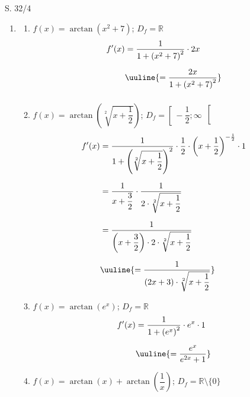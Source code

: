 \begin{Exercise}{S. 32/4}{}
    \begin{enumerate}
        \item [4.]\begin{enumerate}[label=\alph*)]
            \item[a)] {
                $f(x) = \arctan\left(x^{2} + 7\right)$; \qquad $D_{f} = \mathbb{R}$ \\[-2.0ex]
                \begin{align*}
                    f'(x) &= \dfrac{1}{1 + \left(x^{2} + 7\right)^{2}} \cdot 2x &&\\[1.5ex]
                    &\uuline{= \dfrac{2x}{1 + \left(x^{2} + 7\right)^{2}}} && \\[1.5ex]
                \end{align*}
                }
            \item[b)] {
                $f(x) = \arctan\left(\sqrt[2]{x + \dfrac{1}{2}}\right)$; \qquad $D_{f} = \left[ \ -\dfrac{1}{2}; \infty \ \right[$ \\[-1.0ex]
                \begin{align*}
                    f'(x) &= \dfrac{1}{1 + \left(\sqrt[2]{x + \dfrac{1}{2}}\right)^{2}} \cdot \dfrac{1}{2} \cdot \left(x + \dfrac{1}{2}\right)^{-\frac{1}{2}} \cdot 1 &&\\[1.5ex]
                    &= \dfrac{1}{x + \dfrac{3}{2}} \cdot \dfrac{1}{2 \cdot \sqrt[2]{x + \dfrac{1}{2}}} && \\[1.5ex]
                    &= \dfrac{1}{\left(x + \dfrac{3}{2}\right) \cdot 2 \cdot \sqrt[2]{x + \dfrac{1}{2}}} && \\[1.5ex]
                    &\uuline{= \dfrac{1}{{\left(2x + 3\right) \cdot \sqrt[2]{x + \dfrac{1}{2}}}}} && 
                \end{align*}
                }
            \item[c)] {
                $f(x) = \arctan\left(e^{x}\right)$; \qquad $D_{f} = \mathbb{R}$ \\[-2.0ex]
                \begin{align*}
                    f'(x) &= \dfrac{1}{1 + \left(e^{x}\right)^{2}} \cdot e^{x} \cdot 1 &&\\[1.5ex]
                    &\uuline{= \dfrac{e^{x}}{e^{2x} + 1}} &&
                \end{align*}
                }
            \item[d)] {
                $f(x) = \arctan\left(x\right) + \arctan\left(\dfrac{1}{x}\right)$; \qquad $D_{f} = \mathbb{R} \setminus \{ 0 \}$ \\[-2.0ex]
}
\end{enumerate}
\end{enumerate}
\end{Exercise}
